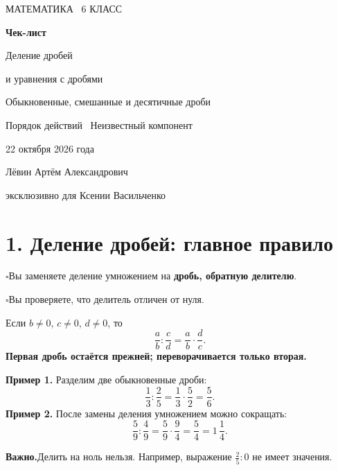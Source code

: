 \documentclass[a4paper,12pt]{article}
\newcommand{\sect}[1]{\section*{\color{darkaccent}#1}}
\newcommand{\learn}[1]{\par\noindent$\square$\enspace #1\par}
\newcommand{\remember}[1]{\par\smallskip\noindent\textcolor{darkaccent}{\textbf{Важно.}}\enspace #1\par\smallskip}
\newcommand{\mix}[3]{#1\,\frac{#2}{#3}}
\begin{document}
\hypersetup{pageanchor=false}
\begin{titlepage}
\thispagestyle{empty}
\centering
\vspace*{28mm}
{\color{accent}\large МАТЕМАТИКА \textbullet\ 6 КЛАСС\par}
\vspace{19mm}
{\color{darkaccent}\Huge\bfseries Чек-лист\par}
\vspace{9mm}
{\LARGE Деление дробей\par}
\vspace{4mm}
{\Large и уравнения с дробями\par}
\vspace{8mm}
{\large Обыкновенные, смешанные и десятичные дроби\par}
{\large Порядок действий \textbullet\ Неизвестный компонент\par}
\vspace{22mm}
{\large 22 октября 2026 года\par}
\vfill
{\large Лёвин Артём Александрович\par}
\vspace{3mm}
{\normalsize эксклюзивно для Ксении Васильченко\par}
\vspace{34mm}
\end{titlepage}
\hypersetup{pageanchor=true}

\sect{1. Деление дробей: главное правило}
\learn{Вы заменяете деление умножением на \textbf{дробь, обратную делителю}.}
\learn{Вы проверяете, что делитель отличен от нуля.}

Если $b\ne0$, $c\ne0$, $d\ne0$, то
\[
\boxed{\frac ab:\frac cd=\frac ab\cdot\frac dc}.
\]
\textbf{Первая дробь остаётся прежней; переворачивается только вторая.}

\textbf{Пример 1.} Разделим две обыкновенные дроби:
\[
\frac13:\frac25=\frac13\cdot\frac52=\boxed{\frac56}.
\]
\textbf{Пример 2.} После замены деления умножением можно сокращать:
\[
\frac59:\frac49=\frac59\cdot\frac94=\boxed{\frac54=\mix{1}{1}{4}}.
\]
\remember{Делить на ноль нельзя. Например, выражение $\frac25:0$ не имеет значения.}
\end{document}
